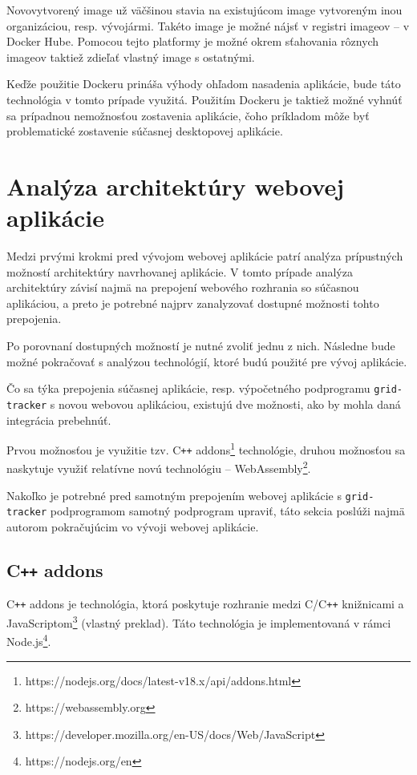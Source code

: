 Novovytvorený image už väčšinou stavia na existujúcom image vytvoreným inou organizáciou, resp. vývojármi. Takéto image je možné nájsť v registri imageov -- v Docker Hube. Pomocou tejto platformy je možné okrem sťahovania rôznych imageov taktiež zdieľať vlastný image s ostatnými.

Keďže použitie Dockeru prináša výhody ohľadom nasadenia aplikácie, bude táto technológia v tomto prípade využitá. Použitím Dockeru je taktiež možné vyhnúť sa prípadnou nemožnosťou zostavenia aplikácie, čoho príkladom môže byť problematické zostavenie súčasnej desktopovej aplikácie.

\section {Analýza architektúry webovej aplikácie}
Medzi prvými krokmi pred vývojom webovej aplikácie patrí analýza prípustných možností architektúry navrhovanej aplikácie. V tomto prípade analýza architektúry závisí najmä na prepojení webového rozhrania so súčasnou aplikáciou, a preto je potrebné najprv zanalyzovať dostupné možnosti tohto prepojenia.

Po porovnaní dostupných možností je nutné zvoliť jednu z nich. Následne bude možné pokračovať s analýzou technológií, ktoré budú použité pre vývoj aplikácie.

Čo sa týka prepojenia súčasnej aplikácie, resp. výpočetného podprogramu \texttt{grid-tracker} s novou webovou aplikáciou, existujú dve možnosti, ako by mohla daná integrácia prebehnúť.

\clearpage

Prvou možnosťou je využitie tzv. C\texttt{++} addons\footnote{https://nodejs.org/docs/latest-v18.x/api/addons.html} technológie, druhou možnosťou sa naskytuje využiť relatívne novú technológiu -- WebAssembly\footnote{https://webassembly.org}.

Nakoľko je potrebné pred samotným prepojením webovej aplikácie s \texttt{grid-tracker} podprogramom samotný podprogram upraviť, táto sekcia poslúži najmä autorom pokračujúcim vo vývoji webovej aplikácie. 

\subsection {C\texttt{++} addons}
C\texttt{++} addons je technológia, ktorá poskytuje rozhranie medzi C/C\texttt{++} knižnicami a JavaScriptom\footnote{https://developer.mozilla.org/en-US/docs/Web/JavaScript} \cite{cpp_addons} (vlastný preklad). Táto technológia je implementovaná v rámci Node.js\footnote{https://nodejs.org/en}.


